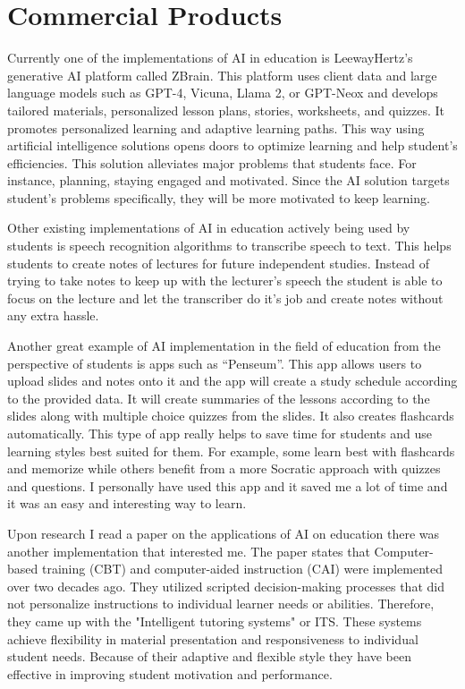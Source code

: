 \documentclass{imc-inf}
\begin{document}
\section{Commercial Products }
Currently one of the implementations of AI in education is LeewayHertz’s generative AI platform called ZBrain. This platform uses client data and large language models such as GPT-4, Vicuna, Llama 2, or GPT-Neox and develops tailored materials, personalized lesson plans, stories, worksheets, and quizzes. It promotes personalized learning and adaptive learning paths. This way using artificial intelligence solutions opens doors to optimize learning and help student’s efficiencies. 
This solution alleviates major problems that students face. For instance, planning, staying engaged and motivated. Since the AI solution targets student’s problems specifically, they will be more motivated to keep learning. 

Other existing implementations of AI in education actively being used by students is speech recognition algorithms to transcribe speech to text. This helps students to create notes of lectures for future independent studies. Instead of trying to take notes to keep up with the lecturer’s speech the student is able to focus on the lecture and let the transcriber do it’s job and create notes without any extra hassle. 

Another great example of AI implementation in the field of education from the perspective of students is apps such as “Penseum”. This app allows users to upload slides and notes onto it and the app will create a study schedule according to the provided data. It will create summaries of the lessons according to the slides along with multiple choice quizzes from the slides. It also creates flashcards automatically. This type of app really helps to save time for students and use learning styles best suited for them. For example, some learn best with flashcards and memorize while others benefit from a more Socratic approach with quizzes and questions. I personally have used this app and it saved me a lot of time and it was an easy and interesting way to learn. 

Upon research I read a paper on the applications of AI \cite{4} on education there was another implementation that interested me. The paper states that Computer-based training (CBT) and computer-aided instruction (CAI) were implemented over two decades ago. They utilized scripted decision-making processes that did not personalize instructions to individual learner needs or abilities. Therefore, they came up with the "Intelligent tutoring systems" or ITS. These systems achieve flexibility in material presentation and responsiveness to individual student needs. Because of their adaptive and flexible style they have been effective in improving student motivation and performance. 
\end{document}
